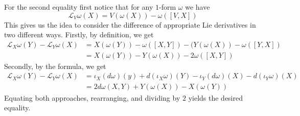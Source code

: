 \documentclass[a4paper, 12pt]{article}
\begin{document}
\begin{Exercise}
\begin{enumerate}[label=(\roman*)]
            For the second equality first notice that for any $1$-form $\omega$ we have
            \[
                \mathcal{L}_V\omega(X) = V(\omega(X)) - \omega([V,X])
            \]
            This gives us the idea to consider the difference of appropriate Lie derivatives in two different ways.
            Firstly, by definition, we get
            \begin{align*}
                \mathcal{L}_X\omega(Y) - \mathcal{L}_Y\omega(X)
                &= X(\omega(Y)) - \omega([X, Y]) - (Y(\omega(X)) - \omega([Y, X]) \\
                &= X(\omega(Y)) - Y(\omega(X)) - 2 \omega([X, Y])
            \end{align*}
            Secondly, by the formula, we get
            \begin{align*}
                \mathcal{L}_X\omega(Y) - \mathcal{L}_Y\omega(X)
                &= \iota_X(d\omega)(y) + d(\iota_X\omega)(Y) - \iota_Y(d\omega)(X) - d(\iota_Y\omega)(X) \\
                &= 2 d\omega(X, Y) + Y(\omega(X)) - X(\omega(Y))
            \end{align*}
            Equating both approaches, rearranging, and dividing by $2$ yields the desired equality.
    \end{enumerate}
\end{Exercise}
\end{document}

